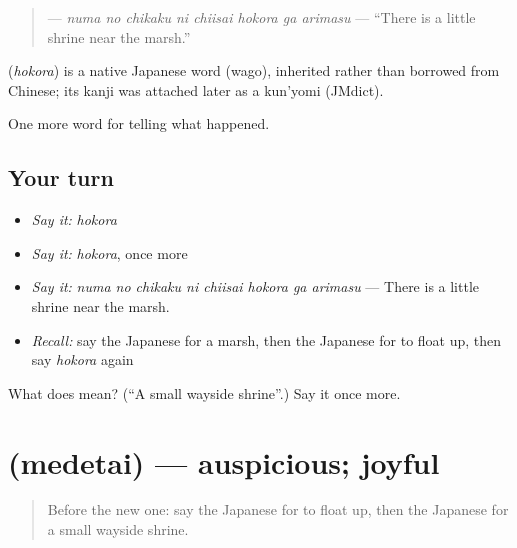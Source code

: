 \begin{quote}
\textbf{    } — \emph{numa no chikaku ni chiisai hokora ga arimasu} — \textquotedblleft{}There is a little shrine near the marsh.\textquotedblright{}
\end{quote}

\begin{cousinweb}
\textbf{} (\emph{hokora}) is a native Japanese word (wago), inherited rather than borrowed from Chinese; its kanji was attached later as a kun'yomi (JMdict).
\end{cousinweb}

\begin{grammarlens}[title={What you've built}]
One more word for telling what happened.
\end{grammarlens}

\subsection*{Your turn}
\begin{itemize}
\raggedright
  \item \emph{Say it:} \emph{hokora}
  \item \emph{Say it:} \emph{hokora}, once more
  \item \emph{Say it:} \emph{numa no chikaku ni chiisai hokora ga arimasu} — There is a little shrine near the marsh.
  \item \emph{Recall:} say the Japanese for a marsh, then the Japanese for to float up, then say \emph{hokora} again
\end{itemize}

\begin{tcolorbox}[breakable,colback=teal!4,colframe=teal!35!black,title={Before you move on}]
What does  mean? (\textquotedblleft{}A small wayside shrine\textquotedblright{}.) Say it once more.
\end{tcolorbox}
\section[\texorpdfstring{\ja{めでたい} (medetai)}{めでたい (medetai)}]{ (medetai) — auspicious; joyful}

\label{lesson:JA-C303-medetai}



\begin{quote}
Before the new one: say the Japanese for to float up, then the Japanese for a small wayside shrine.
\end{quote}

